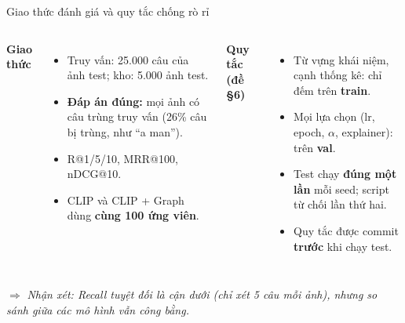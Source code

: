 \documentclass[10pt, aspectratio=169]{beamer}
\makeatletter
\newcommand{\nhanxet}[1]{\par\smallskip$\Rightarrow$ \textit{Nhận xét: #1}}
\newcommand{\mrr}{MRR@100}
\makeatother
\begin{document}
\begin{frame}{Giao thức đánh giá và quy tắc chống rò rỉ}
  \begin{columns}[T]
      \textbf{Giao thức}
      \begin{itemize}
        \item Truy vấn: 25.000 câu của ảnh test; kho: 5.000 ảnh test.
        \item \textbf{Đáp án đúng:} mọi ảnh có câu trùng truy vấn (26\% câu bị trùng, như ``a man'').
        \item R@1/5/10, \mrr, nDCG@10.
        \item CLIP và CLIP + Graph dùng \textbf{cùng 100 ứng viên}.
      \end{itemize}
      \textbf{Quy tắc (đề §6)}
      \begin{itemize}
        \item Từ vựng khái niệm, cạnh thống kê: chỉ đếm trên \textbf{train}.
        \item Mọi lựa chọn (lr, epoch, $\alpha$, explainer): trên \textbf{val}.
        \item Test chạy \textbf{đúng một lần} mỗi seed; script từ chối lần thứ hai.
        \item Quy tắc được commit \textbf{trước} khi chạy test.
      \end{itemize}
  \end{columns}
  \nhanxet{Recall tuyệt đối là cận dưới (chỉ xét 5 câu mỗi ảnh), nhưng so sánh giữa các mô hình vẫn công bằng.}
\end{frame}
\end{document}
